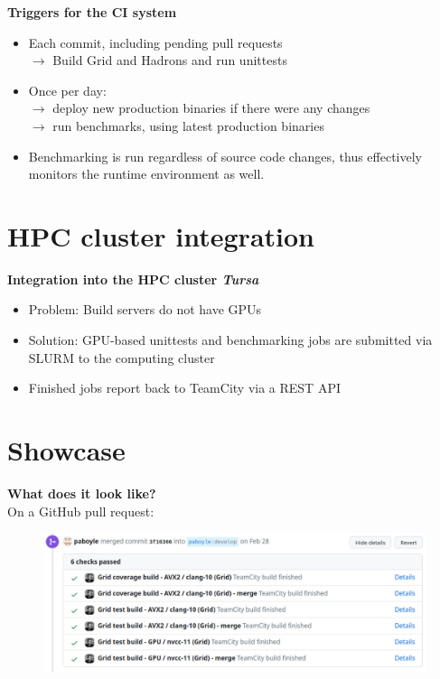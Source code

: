 \documentclass[english,xcolor=pst,11pt]{beamer}
\begin{document}
\begin{frame}
 \textbf{Triggers for the CI system}
\begin{itemize}
 \item Each commit, including pending pull requests \\$\longrightarrow$ Build Grid and Hadrons and run unittests
 \item Once per day: \\$\longrightarrow$ deploy new production binaries if there were any changes \\
 $\longrightarrow$ run benchmarks, using latest production binaries
 \item Benchmarking is run regardless of source code changes, thus effectively monitors the runtime environment as well.
\end{itemize}

\end{frame}




\section{HPC cluster integration}
\begin{frame}
 \textbf{Integration into the HPC cluster \emph{Tursa}}
 \begin{itemize}
  \item Problem: Build servers do not have GPUs
  \item Solution: GPU-based unittests and benchmarking jobs are submitted via SLURM to the computing cluster
  \item Finished jobs report back to TeamCity via a REST API
 \end{itemize}

\end{frame}

\section{Showcase}
\begin{frame}
 \textbf{What does it look like?}\\
 On a GitHub pull request:
  \begin{figure}[H]
	\centering
    {\includegraphics[width=4.5in]{diagrams/pr.jpg}}
\end{figure}
\end{frame}
\end{document}
